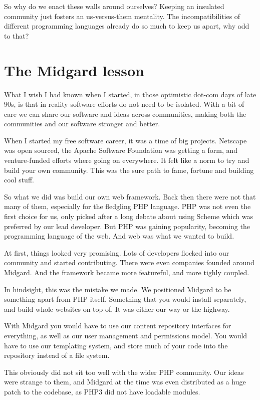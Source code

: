 So why do we enact these walls around ourselves? Keeping an insulated community just fosters an us-versus-them mentality. The incompatibilities of different programming languages already do so much to keep us apart, why add to that? 

\section*{The Midgard lesson}

What I wish I had known when I started, in those optimistic dot-com days of late 90s, is that in reality software efforts do not need to be isolated. With a bit of care we can share our software and ideas across communities, making both the communities and our software stronger and better.

When I started my free software career, it was a time of big projects. Netscape was open sourced, the Apache Software Foundation was getting a form, and venture-funded efforts where going on everywhere. It felt like a norm to try and build your own community. This was the sure path to fame, fortune and building cool stuff.

So what we did was build our own web framework. Back then there were not that many of them, especially for the fledgling PHP language. PHP was not even the first choice for us, only picked after a long debate about using Scheme which was preferred by our lead developer. But PHP was gaining popularity, becoming the programming language of the web. And web was what we wanted to build.

At first, things looked very promising. Lots of developers flocked into our community and started contributing. There were even companies founded around Midgard. And the framework became more featureful, and more tighly coupled.

In hindsight, this was the mistake we made. We positioned Midgard to be something apart from PHP itself. Something that you would install separately, and build whole websites on top of. It was either our way or the highway.

With Midgard you would have to use our content repository interfaces for everything, as well as our user management and permissions model. You would have to use our templating system, and store much of your code into the repository instead of a file system.

This obviously did not sit too well with the wider PHP community. Our ideas were strange to them, and Midgard at the time was even distributed as a huge patch to the codebase, as PHP3 did not have loadable modules.


